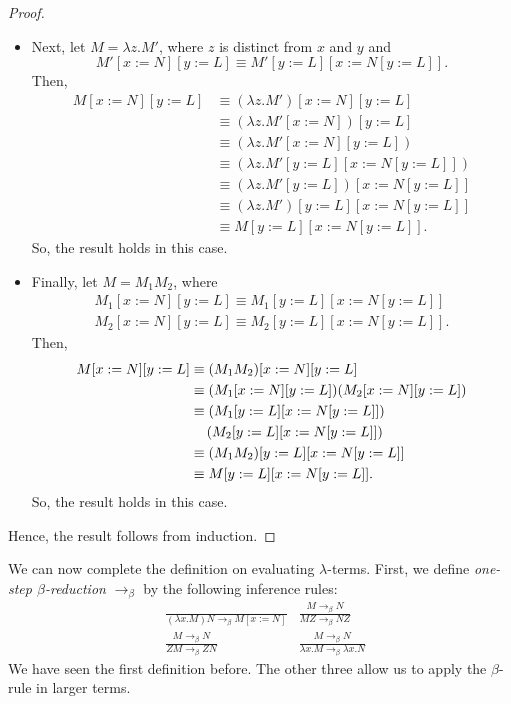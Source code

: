 \documentclass[a4paper, openany]{memoir}
\theoremstyle{definition}
\begin{document}
\begin{proof}
\begin{itemize}
            \item Next, let $M = \lambda z.M'$, where $z$ is distinct from $x$ and $y$ and 
            \[M'[x := N][y := L] \equiv M'[y := L][x := N[y := L]].\]
            Then,
            \begin{align*}
                M[x := N][y := L] &\equiv (\lambda z.M')[x := N][y := L] \\
                &\equiv (\lambda z.M'[x := N])[y := L] \\
                &\equiv (\lambda z.M'[x := N][y := L]) \\
                &\equiv (\lambda z.M'[y := L][x := N[y := L]]) \\
                &\equiv (\lambda z.M'[y := L])[x := N[y := L]] \\
                &\equiv (\lambda z.M')[y := L][x := N[y := L]] \\
                &\equiv M[y := L][x := N[y := L]].
            \end{align*}
            So, the result holds in this case.

            \item Finally, let $M = M_1 M_2$, where
            \begin{align*}
                M_1[x := N][y := L] \equiv M_1[y := L][x := N[y := L]] \\
                M_2[x := N][y := L] \equiv M_2[y := L][x := N[y := L]].
            \end{align*}
            Then,
            \begin{align*}
                M[x := N][y := L] &\equiv (M_1 M_2)[x := N][y := L] \\
                &\equiv (M_1 [x := N][y := L]) (M_2[x := N][y := L]) \\
                &\equiv (M_1[y := L][x := N[y := L]]) \\
                &\hspace*{12pt} (M_2[y := L][x := N[y := L]]) \\
                &\equiv (M_1 M_2) [y := L][x := N[y := L]] \\
                &\equiv M[y := L][x := N[y := L]].
            \end{align*}
            So, the result holds in this case.
        \end{itemize}
        Hence, the result follows from induction.
    \end{proof}

    We can now complete the definition on evaluating $\lambda$-terms. First, we define \emph{one-step $\beta$-reduction} $\to_\beta$ by the following inference rules:
    \begin{align*}
        & \frac{}{(\lambda x.M)N \to_\beta M[x := N]} & \frac{M \to_\beta N}{MZ \to_\beta NZ} \\
        & \frac{M \to_\beta N}{ZM \to_\beta ZN} & \frac{M \to_\beta N}{\lambda x.M \to_\beta \lambda x.N}
    \end{align*}
    We have seen the first definition before. The other three allow us to apply the $\beta$-rule in larger terms.
\end{document}
